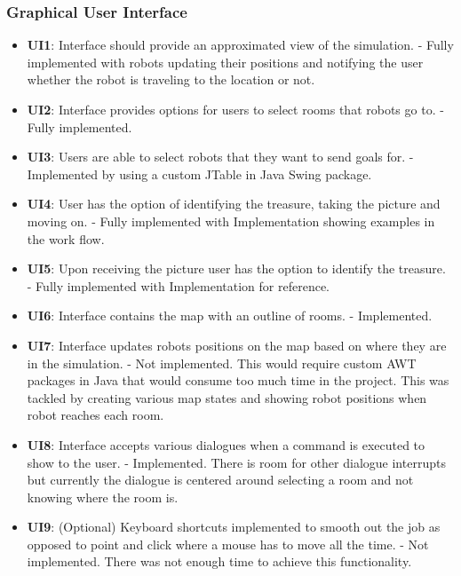     \subsubsection{Graphical User Interface}
      \begin{itemize}
          \item \textbf{UI1}: Interface should provide an approximated view of the simulation. - Fully implemented with robots updating their positions and notifying the user whether the robot is traveling to the location or not.

          \item \textbf{UI2}: Interface provides options for users to select rooms that robots go to. - Fully implemented.

          \item \textbf{UI3}: Users are able to select robots that they want to send goals for. - Implemented by using a custom JTable in Java Swing package.

          \item \textbf{UI4}: User has the option of identifying the treasure, taking the picture and moving on. - Fully implemented with Implementation showing examples in the work flow.

          \item \textbf{UI5}: Upon receiving the picture user has the option to identify the treasure. - Fully implemented with Implementation for reference.

          \item \textbf{UI6}: Interface contains the map with an outline of rooms. - Implemented.

          \item \textbf{UI7}: Interface updates robots positions on the map based on where they are in the simulation. - Not implemented. This would require custom AWT packages in Java that would consume too much time in the project. This was tackled by creating various map states and showing robot positions when robot reaches each room.

          \item \textbf{UI8}: Interface accepts various dialogues when a command is executed to show to the user. - Implemented. There is room for other dialogue interrupts but currently the dialogue is centered around selecting a room and not knowing where the room is.

          \item \textbf{UI9}: (Optional) Keyboard shortcuts implemented to smooth out the job as opposed to point and click where a mouse has to move all the time. - Not implemented. There was not enough time to achieve this functionality.
        \end{itemize}

